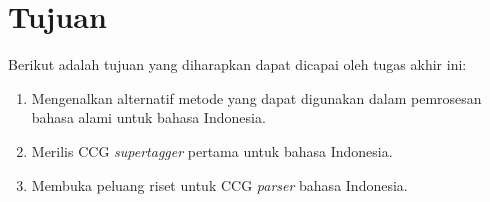 \section{Tujuan}
Berikut adalah tujuan yang diharapkan dapat dicapai oleh tugas akhir ini:
\begin{enumerate}
    \item Mengenalkan alternatif metode yang dapat digunakan dalam pemrosesan bahasa alami untuk
      bahasa Indonesia.
    \item Merilis CCG \textit{supertagger} pertama untuk bahasa Indonesia.
    \item Membuka peluang riset untuk CCG \textit{parser} bahasa Indonesia.
\end{enumerate}


